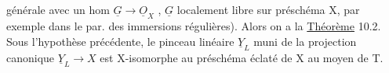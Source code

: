  générale avec un hom  $\underline{G} \to \underline{O}_{X}$ , $\underline{G}$ localement libre sur préschéma X, par
 exemple dans le par. des immersions régulières).  Alors on a la
 \uline{Théorème}  10.2.   Sous l'hypothèse précédente, le pinceau
linéaire $\underline{Y}_{L}$  muni de la projection canonique $\underline{Y}_{L} \longrightarrow X$  est  X-isomorphe
 au préschéma éclaté  de X au moyen de T.


